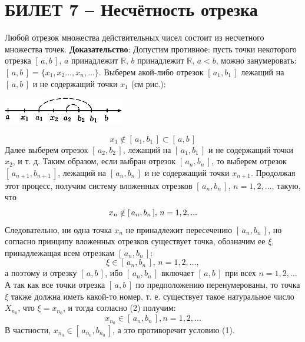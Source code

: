 \documentclass{article}
\newcommand{\R}{\mathbb R}
\begin{document}
\section{БИЛЕТ 7 -- Несчётность отрезка}
Любой отрезок множества действительных чисел состоит из несчетного множества точек.
\newline
\newline
\textbf{Доказательство}:
\newline
\newline
Допустим противное: пусть точки некоторого отрезка $[\,a,b\,]$, $a$ принадлежит $\R$, $b$ принадлежит $\R$, $a < b$, можно занумеровать: $[\,a,b\,] = \{x_{1},x_{2}...,x_{n},...\}$. Выберем акой-либо отрезок $[\,a_{1},b_{1}\,]$ лежащий на $[\,a,b\,]$ и не содержащий точки $x_{1}$ (см рис.):
    \newline
    \newline
    \begin{center}
    \includegraphics[scale=1.5]{5.jpg}
    \end{center}
    $$ x_{1} \notin [\,a_{1},b_{1}\,] \subset [\,a,b\,] $$
    Далее выберем отрезок $[\,a_{2},b_{2}\,]$, лежащий на $[\,a_{1},b_{1}\,]$ и не содержащий точки $x_{2}$, и т. д. Таким образом, если выбран отрезок $[\,a_{n},b_{n}\,]$, то выберем отрезок $[\,a_{n+1},b_{n+1}\,]$, лежащий на $[\,a_{n},b_{n}\,]$ и не содержащий точки $x_{n+1}$. Продолжая этот процесс, получим систему вложенных отрезков $[\,a_{n},b_{n}\,]$, $n = 1, 2, ...$, такую, что
    \begin{equation}
        \setcounter{equation}{1}
         x_{n} \notin [\,a_{n},b_{n}\,],\,n = 1, 2, ... 
    \end{equation}
     Следовательно, ни одна точка $x_{n}$ не принадлежит пересечению $[\,a_{n},b_{n}\,]$, но согласно принципу вложенных отрезков существует точка, обозначим ее $\xi$, принадлежащая всем отрезкам $[\,a_{n},b_{n}\,]$:
     \begin{equation}
         \xi \in [\,a_{n},b_{n}\,], \,n = 1, 2, ...,
     \end{equation} 
     а поэтому и отрезку $[\,a,b\,]$, ибо $[\,a_{n},b_{n}\,]$ включает $[\,a,b\,]$ при всех   $n = 1, 2, ...$ А так как все точки отрезка $[\,a,b\,]$ по предположению перенумерованы, то точка $\xi$ также должна иметь какой-то номер, т. е. существует такое натуральное число $X_{n_{0}}$, что $\xi = x_{n_{0}}$, и тогда согласно (2) получим:
     $$ x_{n_{0}} \in [\,a_{n},b_{n}\,], n = 1, 2, ... $$
     В частности, $ x_{n_{0}} \in [\,a_{n_{0}},b_{n_{0}}\,]$, а это противоречит условию (1). 
\newpage
\end{document}

